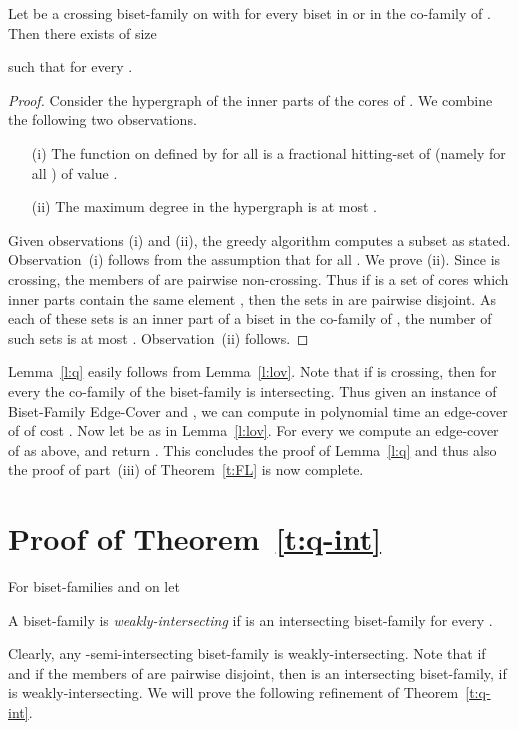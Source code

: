 \begin{lemma} \label{l:lov}
Let  be a crossing biset-family on  with 
for every biset  in  or in the co-family of .
Then there exists  of size 
 
such that  for every .
\end{lemma}
\begin{proof}
Consider the hypergraph 
of the inner parts of the cores of .
We combine the following two observations.  
\begin{itemize}
\item[(i)]
The function  on  defined by  for all  is a fractional 
hitting-set of  (namely  for all )
of value . 
\item[(ii)]
The maximum degree in the hypergraph  is at most .
\end{itemize}
Given observations (i) and (ii), the greedy algorithm 
computes a subset  as stated.
Observation~(i) follows from the assumption that  for all .
We prove (ii). Since  is crossing, the members of  
are pairwise non-crossing. Thus if  is a set of cores
which inner parts contain the same element , then the sets in 
 are pairwise disjoint.
As each of these sets is an inner part of a biset in the co-family of ,
the number of such sets is at most . Observation~(ii) follows.
\end{proof}

Lemma~\ref{l:q} easily follows from Lemma~\ref{l:lov}.
Note that if  is crossing, then 
for every  the co-family of the biset-family 
 is intersecting.
Thus given an instance of {\sf Biset-Family Edge-Cover} and ,
we can compute in polynomial time an edge-cover  of  of cost
.
Now let  be as in Lemma~\ref{l:lov}. For every  we compute an edge-cover 
 of  as above, and return . 
This concludes the proof of Lemma~\ref{l:q} and thus also the proof of part~(iii)
of Theorem~\ref{t:FL} is now complete.

\section{Proof of Theorem~\ref{t:q-int}} \label{s:q-int}

\begin{definition}
For biset-families  and  on  let 

A biset-family  is {\em weakly-intersecting} if  is 
an intersecting biset-family for every .
\end{definition}

Clearly, any -semi-intersecting biset-family is weakly-intersecting.
Note that if  
and if the members of  are pairwise disjoint, 
then  is an intersecting biset-family, if  is weakly-intersecting.
We will prove the following refinement of Theorem~\ref{t:q-int}.

